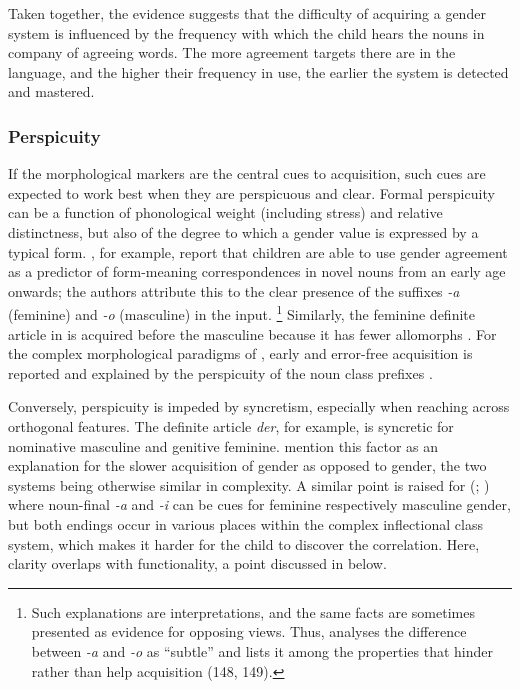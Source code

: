 \documentclass[output=collectionpaper]{langsci/langscibook}
\begin{document}
Taken together, the evidence suggests that the difficulty of acquiring a gender system is influenced by the frequency with which the child hears the nouns in company of agreeing words. The more agreement targets there are in the language, and the higher their frequency in use, the earlier the system is detected and mastered.

\subsubsection{Perspicuity}
\label{sec:Audr:4.2.2}

If the morphological markers are the central cues to acquisition, such cues are expected to work best when they are perspicuous and clear. Formal perspicuity can be a function of phonological weight (including stress) and relative distinctness, but also of the degree to which a gender value is expressed by a typical form. \citet{Arias-Trejo2013}, for example, report that  children are able to use gender agreement as a predictor of form-meaning correspondences in novel nouns from an early age onwards; the authors attribute this to the clear presence of the suffixes \textit{-a} (feminine) and \textit{-o} (masculine) in the input.%
\footnote{Such explanations are interpretations, and the same facts are sometimes presented as evidence for opposing views. Thus, \citet{Mariscal2009} analyses the difference between  \textit{-a} and \textit{-o} as ``subtle'' and lists it among the properties that hinder rather than help acquisition (148, 149).} %
Similarly, the feminine definite article in  is acquired before the masculine because it has fewer allomorphs \citep[514]{Pizzuto1992}. For the complex morphological paradigms of , early and error-free acquisition is reported and explained by the perspicuity of the noun class prefixes \citep[213]{Demuth2003}.

Conversely, perspicuity is impeded by syncretism, especially when reaching across orthogonal features. The  definite article \textit{der}, for example, is syncretic for nominative masculine and genitive feminine. \citet{Eichler2013} mention this factor as an explanation for the slower acquisition of  gender as opposed to  gender, the two systems being otherwise similar in complexity. A similar point is raised for  (\citealt{Mulford1985}; \citealt{Levy1988}) where noun-final \textit{-a} and \textit{-i} can be cues for feminine respectively masculine gender, but both endings occur in various places within the complex inflectional class system, which makes it harder for the child to discover the correlation. Here, clarity overlaps with functionality, a point discussed in  below.
\end{document}
